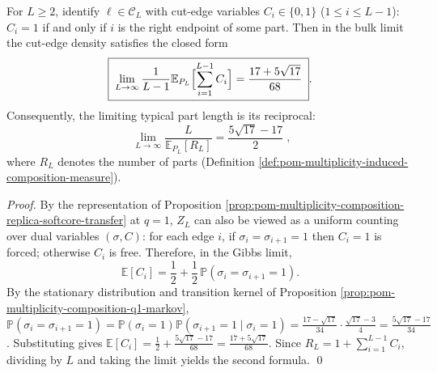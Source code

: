 \begin{corollary}\label{cor:pom-multiplicity-composition-cut-density}
For \(L\ge 2\), identify \(\boldsymbol{\ell}\in\mathcal{C}_L\) with cut-edge variables \(C_i\in\{0,1\}\) (\(1\le i\le L-1\)):
\(C_i=1\) if and only if \(i\) is the right endpoint of some part.
Then in the bulk limit the cut-edge density satisfies the closed form
\[
\boxed{\;
\lim_{L\to\infty}\frac{1}{L-1}\mathbb{E}_{P_L}\Bigl[\sum_{i=1}^{L-1}C_i\Bigr]
=\frac{17+5\sqrt{17}}{68}\; }.
\]
Consequently, the limiting typical part length is its reciprocal:
\[
\boxed{\;
\lim_{L\to\infty}\frac{L}{\mathbb{E}_{P_L}[R_L]}
=\frac{5\sqrt{17}-17}{2}\; } ,
\]
where \(R_L\) denotes the number of parts (Definition \ref{def:pom-multiplicity-induced-composition-measure}).
\end{corollary}
\begin{proof}
By the representation of Proposition \ref{prop:pom-multiplicity-composition-replica-softcore-transfer} at \(q=1\),
\(Z_L\) can also be viewed as a uniform counting over dual variables \((\sigma,C)\): for each edge \(i\), if \(\sigma_i=\sigma_{i+1}=1\) then \(C_i=1\) is forced; otherwise \(C_i\) is free.
Therefore, in the Gibbs limit,
\[
\mathbb{E}[C_i]=\frac12+\frac12\,\mathbb{P}(\sigma_i=\sigma_{i+1}=1).
\]
By the stationary distribution and transition kernel of Proposition \ref{prop:pom-multiplicity-composition-q1-markov},
\(
\mathbb{P}(\sigma_i=\sigma_{i+1}=1)=\mathbb{P}(\sigma_i=1)\mathbb{P}(\sigma_{i+1}=1\mid\sigma_i=1)
=\frac{17-\sqrt{17}}{34}\cdot \frac{\sqrt{17}-3}{4}
=\frac{5\sqrt{17}-17}{34}
\).
Substituting gives
\(
\mathbb{E}[C_i]=\frac12+\frac{5\sqrt{17}-17}{68}=\frac{17+5\sqrt{17}}{68}
\).
Since \(R_L=1+\sum_{i=1}^{L-1}C_i\), dividing by \(L\) and taking the limit yields the second formula. \qed
\end{proof}


